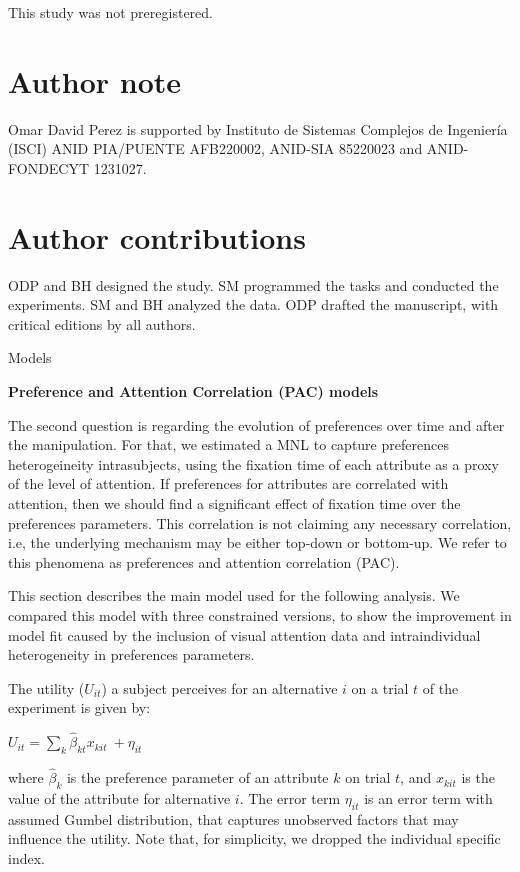 This study was not preregistered.

\section{Author note}\label{author-note}

Omar David Perez is supported by Instituto de Sistemas Complejos de Ingeniería (ISCI) ANID PIA/PUENTE AFB220002, ANID-SIA 85220023 and ANID-FONDECYT 1231027.

\section{Author contributions}\label{author-contributions}

ODP and BH designed the study. SM programmed the tasks and conducted the experiments. SM and BH analyzed the data. ODP drafted the manuscript, with critical editions by all authors.

Models

\textbf{Preference and Attention Correlation (PAC) models}

The second question is regarding the evolution of preferences over time and after the manipulation. For that, we estimated a MNL to capture preferences heterogeineity intrasubjects, using the fixation time of each attribute as a proxy of the level of attention. If preferences for attributes are correlated with attention, then we should find a significant effect of fixation time over the preferences parameters. This correlation is not claiming any necessary correlation, i.e, the underlying mechanism may be either top-down or bottom-up. We refer to this phenomena as preferences and attention correlation (PAC).

This section describes the main model used for the following analysis. We compared this model with three constrained versions, to show the improvement in model fit caused by the inclusion of visual attention data and intraindividual heterogeneity in preferences parameters.

The utility (\(U_{it}\)) a subject perceives for an alternative \(i\) on a trial \(t\) of the experiment is given by:

\(U_{it} = \sum_{k}^{}{\widehat{\beta}}_{kt}x_{kit}\  + \eta_{it}\ \)

where \({\widehat{\beta}}_{k}\) is the preference parameter of an attribute \(k\) on trial \(t\), and \(x_{kit}\) is the value of the attribute for alternative \(i\). The error term \(\eta_{it}\) is an error term with assumed Gumbel distribution, that captures unobserved factors that may influence the utility. Note that, for simplicity, we dropped the individual specific index.

